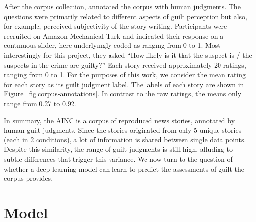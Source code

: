 \documentclass[11pt,a4paper]{article}
\begin{document}
After the corpus collection, \citeauthor{Kreiss:2019} annotated the corpus with human judgments. The questions were primarily related to different aspects of guilt perception but also, for example, perceived subjectivity of the story writing. Participants were recruited on Amazon Mechanical Turk and indicated their response on a continuous slider, here underlyingly coded as ranging from 0 to 1. Most interestingly for this project, they asked ``How likely is it that the suspect is / the suspects in the crime are guilty?'' Each story received approximately 20 ratings, ranging from 0 to 1. For the purposes of this work, we consider the mean rating for each story as its guilt judgment label. The labels of each story are shown in Figure~\ref{fig:corpus-annotations}. In contrast to the raw ratings, the means only range from 0.27 to 0.92. 




In summary, the AINC is a corpus of reproduced news stories, annotated by human guilt judgments. Since the stories originated from only 5 unique stories (each in 2 conditions), a lot of information is shared between single data points.  Despite this similarity, the range of guilt judgments is still high, alluding to subtle differences that trigger this variance. We now turn to the question of whether a deep learning model can learn to predict the assessments of guilt the corpus provides.



\section{Model}\label{model-architecture}
\end{document}
